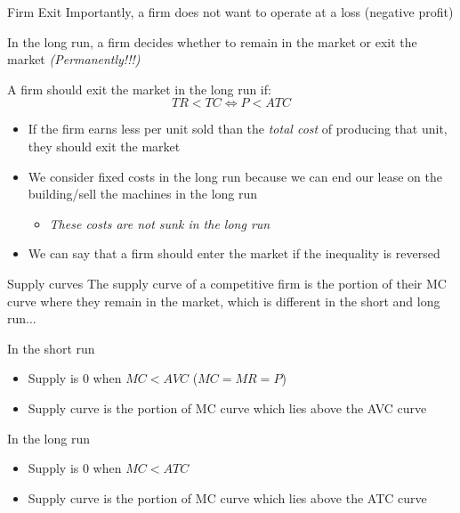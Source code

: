 \documentclass[compress]{beamer}
\begin{document}
\begin{frame}{Firm Exit}
    Importantly, a firm does not want to operate at a loss (negative profit)

    \vspace{4mm}

    In the long run, a firm decides whether to remain in the market or exit the market \textit{(Permanently!!!)}

    \begin{block}{A firm should exit the market in the long run if:}
        \[TR < TC \iff P < ATC\]
        \begin{itemize}
            \item If the firm earns less per unit sold than the \textit{total cost} of producing that unit, they should exit the market
            \item We consider fixed costs in the long run because we can end our lease on the building/sell the machines in the long run
            \begin{itemize}
                \item \textit{These costs are not sunk in the long run}
            \end{itemize}
            \item We can say that a firm should enter the market if the inequality is reversed
        \end{itemize}
    \end{block}
\end{frame}

\begin{frame}{Supply curves}
    The supply curve of a competitive firm is the portion of their MC curve where they remain in the market, which is different in the short and long run...

    \begin{block}{In the short run}
        \begin{itemize}
            \item Supply is 0 when \(MC<AVC\) \quad ($MC = MR = P$)
            \item Supply curve is the portion of MC curve which lies above the AVC curve
        \end{itemize}
    \end{block}

        \begin{block}{In the long run}
        \begin{itemize}
            \item Supply is 0 when \(MC<ATC\)
            \item Supply curve is the portion of MC curve which lies above the ATC curve
        \end{itemize}
    \end{block}
\end{frame}
\end{document}
